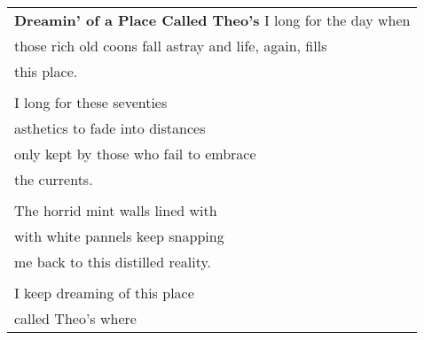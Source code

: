\documentclass{article}
\begin{document}
\newcommand{\h}{\hspace{3ex}}

\begin{center}
\begin{tabular}{l}
\textbf{Dreamin' of a Place Called Theo's}
I long for the day when \\
those rich old coons fall astray
and life, again, fills \\
this place. \\
\\
I long for these seventies \\
asthetics to fade into distances \\
only kept by those who fail to embrace \\
the currents. \\
\\
The horrid mint walls lined with \\
with white pannels keep snapping \\
me back to this distilled reality. \\
\\
I keep dreaming of this place \\
called Theo's where

\end{tabular}
\end{center}
\end{document}
